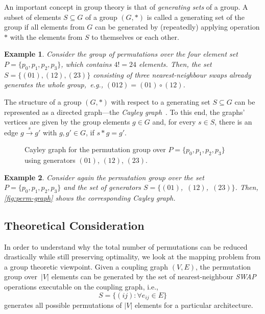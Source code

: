 \documentclass[10pt,conference]{IEEEtran}
\newtheorem{example}{Example}
\begin{document}
An important concept in group theory is that of \emph{generating sets} of a group.
A subset of elements $S \subseteq G$ of a group  $(G, *)$ is called a generating set of the group if all elements from $G$ can be generated by (repeatedly) applying operation $*$ with the elements from $S$ to themselves or each other.

\begin{example}\label{ex:group_generate}
	Consider the group of permutations over the four element set \mbox{$P=\{p_0, p_1, p_2, p_3\}$}, which contains \mbox{$4! = 24$} elements. 
	Then, the set \mbox{$S = \{(01), (12), (23)\}$} consisting of three \mbox{nearest-neighbour} swaps already generates the whole group,~e.g., $(012) = (01) \circ (12)$.
\end{example}

The structure of a group $(G, *)$ with respect to a generating set $S\subseteq G$ can be represented as a directed graph---the \emph{Cayley graph}~\cite{carterVisualGroupTheory2009}. 
To this end, the graphs' vertices are given by the group elements $g \in G$ and, for every $s\in S$, there is an edge $g \xrightarrow{s} g'$ with $g,g'\in G$, if $s * g = g'$.

\begin{figure}[t]
\centering
\resizebox{0.85\linewidth}{!}{
\begin{tikzpicture}
	
\end{tikzpicture}} 
  \caption{Cayley graph for the permutation group over $P=\{p_0, p_1, p_2, p_3\}$ using generators \textcolor{Blue01}{$(01)$}, \textcolor{Yellow12}{$(12)$}, \textcolor{Gray23}{$(23)$}.}
  \vspace*{-0.5em}
  \label{fig:perm-graph}
\end{figure}

\begin{example}\label{ex:cayley}
	Consider again the permutation group over the set \mbox{$P=\{p_0, p_1, p_2, p_3\}$} and the set of generators \mbox{$S=\{$\textcolor{Blue01}{$(01)$}, \textcolor{Yellow12}{$(12)$}, \textcolor{Gray23}{$(23)$}$\}$}. Then, \autoref{fig:perm-graph} shows the corresponding Cayley graph.
\end{example}

\subsection{Theoretical Consideration}\label{sec:theory}

In order to understand why the total number of permutations can be reduced drastically while still preserving optimality, we look at the mapping problem from a group theoretic viewpoint.
Given a coupling graph $(V, E)$, the permutation group over~$|V|$ elements can be generated by the set of nearest-neighbour \textit{SWAP} operations executable on the coupling graph, i.e.,
\[S = \{(ij)\colon \forall e_{ij}\in E\}\]
 generates all possible permutations of $|V|$ elements for a particular architecture.
 
\end{document}
